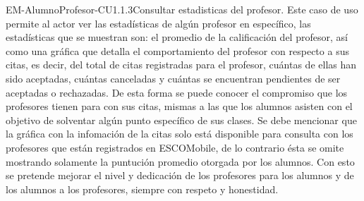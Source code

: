 \begin{UseCase}{EM-AlumnoProfesor-CU1.1.3}{Consultar estadisticas del profesor.}{
	\noindent
	Este caso de uso permite al actor ver las estadísticas de algún profesor en específico, las estadísticas que se muestran son: el promedio de la calificación del profesor, así como una gráfica que detalla el comportamiento del profesor con respecto a sus citas, es decir, del total de citas registradas para el profesor, cuántas de ellas han sido aceptadas, cuántas canceladas y cuántas se encuentran pendientes de ser aceptadas o rechazadas. De esta forma se puede conocer el compromiso que los profesores tienen para con sus citas, mismas a las que los alumnos asisten con el objetivo de solventar algún punto específico de sus clases. Se debe mencionar que la gráfica con la infomación de la citas solo está disponible para consulta con los profesores que están registrados en ESCOMobile, de lo contrario ésta se omite mostrando solamente la puntución promedio otorgada por los alumnos. Con esto se pretende mejorar el nivel y dedicación de los profesores para los alumnos y de los alumnos a los profesores, siempre con respeto y honestidad.
	\newline
	}
\end{UseCase}

